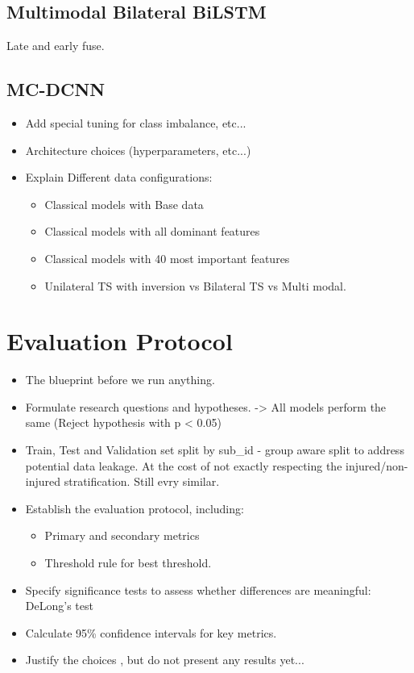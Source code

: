 \subsection{Multimodal Bilateral BiLSTM}\label{subsec:method-deep-learning}
Late and early fuse.
\subsection{MC-DCNN}\label{subsec:method-deep-learning}

\begin{itemize}
    \item Add special tuning for class imbalance, etc...
    \item Architecture choices (hyperparameters, etc...)
    \item Explain Different data configurations:
    \begin{itemize}
        \item Classical models with Base data
        \item Classical models with all dominant features
        \item Classical models with 40 most important features
        \item Unilateral TS with inversion vs Bilateral TS vs Multi modal.
    \end{itemize}
\end{itemize}

\section{Evaluation Protocol}\label{sec:method-evaluation-protocol}

\begin{itemize}
    \item The blueprint before we run anything.
    \item Formulate research questions and hypotheses. -> All models perform the same (Reject hypothesis with p < 0.05)
    \item Train, Test and Validation set split by sub\_id - group aware split to address potential data leakage. At the cost of not exactly respecting the injured/non-injured stratification. Still evry similar.
    \item Establish the evaluation protocol, including:
    \begin{itemize}
        \item Primary and secondary metrics
        \item Threshold rule for best threshold.
    \end{itemize}
    \item Specify significance tests to assess whether differences are meaningful: DeLong's test
    \item Calculate 95\% confidence intervals for key metrics.
    \item Justify the choices , but do not present any results yet...
\end{itemize}

